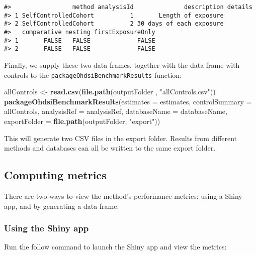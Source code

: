 \documentclass[]{article}
\newenvironment{Shaded}{\begin{snugshade}}{\end{snugshade}}
\newcommand{\DataTypeTok}[1]{\textcolor[rgb]{0.13,0.29,0.53}{#1}}
\newcommand{\KeywordTok}[1]{\textcolor[rgb]{0.13,0.29,0.53}{\textbf{#1}}}
\newcommand{\NormalTok}[1]{#1}
\newcommand{\StringTok}[1]{\textcolor[rgb]{0.31,0.60,0.02}{#1}}
\begin{document}
\begin{verbatim}
#>                 method analysisId              description details
#> 1 SelfControlledCohort          1       Length of exposure        
#> 2 SelfControlledCohort          2 30 days of each exposure        
#>   comparative nesting firstExposureOnly
#> 1       FALSE   FALSE             FALSE
#> 2       FALSE   FALSE             FALSE
\end{verbatim}

Finally, we supply these two data frames, together with the data frame
with controls to the \texttt{packageOhdsiBenchmarkResults} function:

\begin{Shaded}
\begin{Highlighting}[]
\NormalTok{allControls <-}\StringTok{ }\KeywordTok{read.csv}\NormalTok{(}\KeywordTok{file.path}\NormalTok{(outputFolder , }\StringTok{"allControls.csv"}\NormalTok{))}
\KeywordTok{packageOhdsiBenchmarkResults}\NormalTok{(}\DataTypeTok{estimates =}\NormalTok{ estimates,}
                             \DataTypeTok{controlSummary =}\NormalTok{ allControls,}
                             \DataTypeTok{analysisRef =}\NormalTok{ analysisRef,}
                             \DataTypeTok{databaseName =}\NormalTok{ databaseName,}
                             \DataTypeTok{exportFolder =} \KeywordTok{file.path}\NormalTok{(outputFolder, }\StringTok{"export"}\NormalTok{))}
\end{Highlighting}
\end{Shaded}

This will generate two CSV files in the export folder. Results from
different methods and databases can all be written to the same export
folder.

\hypertarget{computing-metrics}{%
\subsection{Computing metrics}\label{computing-metrics}}

There are two ways to view the method's performance metrics: using a
Shiny app, and by generating a data frame.

\hypertarget{using-the-shiny-app}{%
\subsubsection{Using the Shiny app}\label{using-the-shiny-app}}

Run the follow command to launch the Shiny app and view the metrics:
\end{document}
